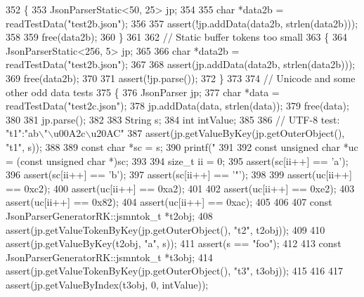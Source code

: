 \begin{DoxyCode}
{{{{{352     \{
353         JsonParserStatic<50, 25> jp;
354 
355         \textcolor{keywordtype}{char} *data2b = readTestData(\textcolor{stringliteral}{"test2b.json"});
356 
357         assert(!jp.addData(data2b, strlen(data2b)));
358 
359         free(data2b);
360     \}
361 
362     \textcolor{comment}{// Static buffer tokens too small}
363     \{
364         JsonParserStatic<256, 5> jp;
365 
366         \textcolor{keywordtype}{char} *data2b = readTestData(\textcolor{stringliteral}{"test2b.json"});
367 
368         assert(jp.addData(data2b, strlen(data2b)));
369         free(data2b);
370 
371         assert(!jp.parse());
372     \}
373 
374     \textcolor{comment}{// Unicode and some other odd data tests}
375     \{
376         JsonParser jp;
377         \textcolor{keywordtype}{char} *data = readTestData(\textcolor{stringliteral}{"test2c.json"});
378         jp.addData(data, strlen(data));
379         free(data);
380 
381         jp.parse();
382 
383         String s;
384         \textcolor{keywordtype}{int} intValue;
385 
386         \textcolor{comment}{// UTF-8 test: "t1":"ab\(\backslash\)"\(\backslash\)u00A2c\(\backslash\)u20AC"}
387         assert(jp.getValueByKey(jp.getOuterObject(), \textcolor{stringliteral}{"t1"}, s));
388 
389         \textcolor{keyword}{const} \textcolor{keywordtype}{char} *sc = s;
390         printf(\textcolor{stringliteral}{"%
391 
392         \textcolor{keyword}{const} \textcolor{keywordtype}{unsigned} \textcolor{keywordtype}{char} *uc = (\textcolor{keyword}{const} \textcolor{keywordtype}{unsigned} \textcolor{keywordtype}{char} *)sc;
393 
394         \textcolor{keywordtype}{size\_t} ii = 0;
395         assert(sc[ii++] == \textcolor{charliteral}{'a'});
396         assert(sc[ii++] == \textcolor{charliteral}{'b'});
397         assert(sc[ii++] == \textcolor{charliteral}{'"'});
398 
399         assert(uc[ii++] == 0xc2);
400         assert(uc[ii++] == 0xa2);
401 
402         assert(uc[ii++] == 0xe2);
403         assert(uc[ii++] == 0x82);
404         assert(uc[ii++] == 0xac);
405 
406 
407         \textcolor{keyword}{const} JsonParserGeneratorRK::jsmntok_t *t2obj;
408         assert(jp.getValueTokenByKey(jp.getOuterObject(), \textcolor{stringliteral}{"t2"}, t2obj));
409 
410         assert(jp.getValueByKey(t2obj, \textcolor{stringliteral}{"a"}, s));
411         assert(s == \textcolor{stringliteral}{"foo"});
412 
413         \textcolor{keyword}{const} JsonParserGeneratorRK::jsmntok_t *t3obj;
414         assert(jp.getValueTokenByKey(jp.getOuterObject(), \textcolor{stringliteral}{"t3"}, t3obj));
415 
416 
417         assert(jp.getValueByIndex(t3obj, 0, intValue));
}}}}}}
\end{DoxyCode}
